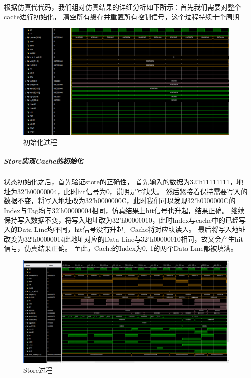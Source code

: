 根据仿真代代码，我们组对仿真结果的详细分析如下所示：首先我们需要对整个cache进行初始化，
清空所有缓存并重置所有控制信号，这个过程持续十个周期
\begin{figure}[H] %
	\centering %
	\includegraphics[width=1.0\textwidth]{figs/res1.png} %
	\caption{初始化过程} %
	\label{Fig.2} %
\end{figure}

\subparagraph{Store实现Cache的初始化}
状态初始化之后，首先验证store的正确性，
首先输入的数据为32'h11111111，地址为32'h00000004，此时hit信号为0，说明是写缺失。
然后紧接着保持需要写入的数据不变，将写入地址改为32'h0000000C，此时我们可以发现32'h0000000C的Index与Tag均与32'h00000004相同，仿真结果上hit信号也升起，结果正确。
继续保持写入数据不变，将写入地址改为32'h00000010，此时Index与cache中的已经写入的Data Line均不同，hit信号没有升起，Cache将对应块读入。
最后将写入地址改变为32'h00000014此地址对应的Data Line与32'h00000010相同，故又会产生hit信号，仿真结果正确。
至此，Cache的Index为0, 1的两个Data Line都被填满。

\begin{figure}[H] %
	\centering %
	\includegraphics[width=1.0\textwidth]{figs/res2.png} %
	\caption{Store过程} %
	\label{Fig.3} %
\end{figure}

